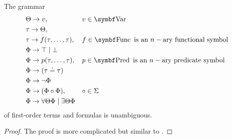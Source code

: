 \begin{proposition}\label{thm:first_order_formulas_are_unambiguous}
  The grammar
  \begin{equation*}
    \begin{aligned}
      &\Theta \to v,                                          && v \in \Cat{Var} \\
      &\tau \to \Theta,                                       && \\
      &\tau \to f(\tau, \ldots, \tau),                        && f \in \Cat{Func} \text{ is an } n-\text{ary functional symbol} \\
      &\Phi \to \top \;|\; \bot                               && \\
      &\Phi \to p(\tau, \ldots, \tau),                        && p \in \Cat{Pred} \text{ is an } n-\text{ary predicate symbol} \\
      &\Phi \to (\tau \doteq \tau)                            && \\
      &\Phi \to \neg \Phi                                     && \\
      &\Phi \to (\Phi \circ \Phi),                            && \circ \in \Sigma \\
      &\Phi \to \forall \Theta \Phi \;|\; \exists \Theta \Phi && \\
    \end{aligned}
  \end{equation*}
  of first-order terms and formulas is unambiguous.
\end{proposition}
\begin{proof}
  The proof is more complicated but similar to .
\end{proof}

